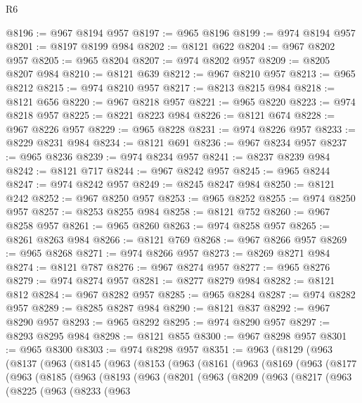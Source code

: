\begin{lexlean}{R6}
\begin{coremodule}
@8196 := @967 @8194 @957
@8197 := @965 @8196
@8199 := @974 @8194 @957
@8201 := @8197 @8199 @984
@8202 := @8121 @622
@8204 := @967 @8202 @957
@8205 := @965 @8204
@8207 := @974 @8202 @957
@8209 := @8205 @8207 @984
@8210 := @8121 @639
@8212 := @967 @8210 @957
@8213 := @965 @8212
@8215 := @974 @8210 @957
@8217 := @8213 @8215 @984
@8218 := @8121 @656
@8220 := @967 @8218 @957
@8221 := @965 @8220
@8223 := @974 @8218 @957
@8225 := @8221 @8223 @984
@8226 := @8121 @674
@8228 := @967 @8226 @957
@8229 := @965 @8228
@8231 := @974 @8226 @957
@8233 := @8229 @8231 @984
@8234 := @8121 @691
@8236 := @967 @8234 @957
@8237 := @965 @8236
@8239 := @974 @8234 @957
@8241 := @8237 @8239 @984
@8242 := @8121 @717
@8244 := @967 @8242 @957
@8245 := @965 @8244
@8247 := @974 @8242 @957
@8249 := @8245 @8247 @984
@8250 := @8121 @242
@8252 := @967 @8250 @957
@8253 := @965 @8252
@8255 := @974 @8250 @957
@8257 := @8253 @8255 @984
@8258 := @8121 @752
@8260 := @967 @8258 @957
@8261 := @965 @8260
@8263 := @974 @8258 @957
@8265 := @8261 @8263 @984
@8266 := @8121 @769
@8268 := @967 @8266 @957
@8269 := @965 @8268
@8271 := @974 @8266 @957
@8273 := @8269 @8271 @984
@8274 := @8121 @787
@8276 := @967 @8274 @957
@8277 := @965 @8276
@8279 := @974 @8274 @957
@8281 := @8277 @8279 @984
@8282 := @8121 @812
@8284 := @967 @8282 @957
@8285 := @965 @8284
@8287 := @974 @8282 @957
@8289 := @8285 @8287 @984
@8290 := @8121 @837
@8292 := @967 @8290 @957
@8293 := @965 @8292
@8295 := @974 @8290 @957
@8297 := @8293 @8295 @984
@8298 := @8121 @855
@8300 := @967 @8298 @957
@8301 := @965 @8300
@8303 := @974 @8298 @957
@8351 := @963
    (@8129
      (@963
        (@8137
          (@963
            (@8145
              (@963
                (@8153
                  (@963
                    (@8161
                      (@963
                        (@8169
                          (@963
                            (@8177
                              (@963
                                (@8185
                                  (@963
                                    (@8193
                                      (@963
                                        (@8201
                                          (@963
                                            (@8209
                                              (@963
                                                (@8217
                                                  (@963
                                                    (@8225
                                                      (@963
                                                        (@8233
                                                          (@963

\end{coremodule}
\end{lexlean}
